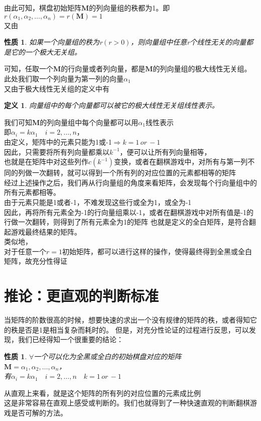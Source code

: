 \documentclass[UTF-8,a4paper]{ctexart}
\newtheorem{definition}[subsubsection]{定义}
\newtheorem{property}[subsubsection]{性质}
\begin{document}
由此可知，棋盘初始矩阵\(\mathbf{M}\)的列向量组的秩都为1。即\(r(\alpha_1,\alpha_2,\dots,\alpha_n)=r(\mathbf{M})=1\)
\\又由
\begin{property}
    如果一个向量组的秩为r\((r > 0)\)，则向量组中任意r个线性无关的向量都是它的一个极大无关组。
\end{property}
可知，任取一个\(\mathbf{M}\)的行向量或者列向量，都是\(\mathbf{M}\)的列向量组的极大线性无关组。
\\此处我们取一个列向量为第一列的向量\(\alpha_1\)
\\又由于极大线性无关组的定义中有
\begin{definition}
    向量组中的每个向量都可以被它的极大线性无关组线性表示。
\end{definition}
我们可知\(\mathbf{M}\)的列向量组中每个向量都可以用\(\alpha_1\)线性表示
\\即\(\alpha_i = k \alpha_1 \quad i=2,\dots,n\)，
\\由定义，矩阵中的元素只能为1或-1\(\Rightarrow k = 1\, or\, -1\)
\\因此，只需要将所有列向量都乘以\(k^{-1}\)，便可以让所有列向量相等，
\\也就是在矩阵中对这些列作\(c(k^{-1})\)变换，或者在翻棋游戏中，对所有与第一列不同的列做一次翻转，就可以得到一个所有列的对应位置的元素都相等的矩阵
\\经过上述操作之后，我们再从行向量组的角度来看矩阵，会发现每个行向量组中的所有元素都相等。
\\由于元素只能是1或者-1，不难发现这些行或全为1，或全为-1
\\因此，再将所有元素全为-1的行向量组乘以-1，或者在翻棋游戏中对所有值是-1的行做一次翻转，则得到了所有元素全为1的矩阵
也就是定义的全白矩阵，是符合翻起游戏最终结果的矩阵。
\\类似地，
\\对于任意一个\(r=1\)初始矩阵，都可以进行这样的操作，使得最终得到全黑或全白矩阵，故充分性得证


\section{推论：更直观的判断标准}
\songti
当矩阵的阶数很高的时候，想要快速的求出一个没有规律的矩阵的秩，或者得知它的秩是否是1是相当复杂而耗时的。
但是，对充分性论证的过程进行反思，可以发现，我们已经得知一个很重要的结论：
\kaishu
\begin{property}
    \(\forall\)一个可以化为全黑或全白的初始棋盘对应的矩阵
    \\\(\mathbf{M}=\alpha_1,\alpha_2,\dots,\alpha_n\)，
    \\有\(\alpha_i = k \alpha_1 \quad i=2,\dots,n \quad k = 1\, or\, -1\)
\end{property}
从直观上来看，就是这个矩阵的所有列的对应位置的元素成比例
\\这是非常容易在直观上感受或判断的。我们也就得到了一种快速直观的判断翻棋游戏是否可解的方法。
\end{document}
